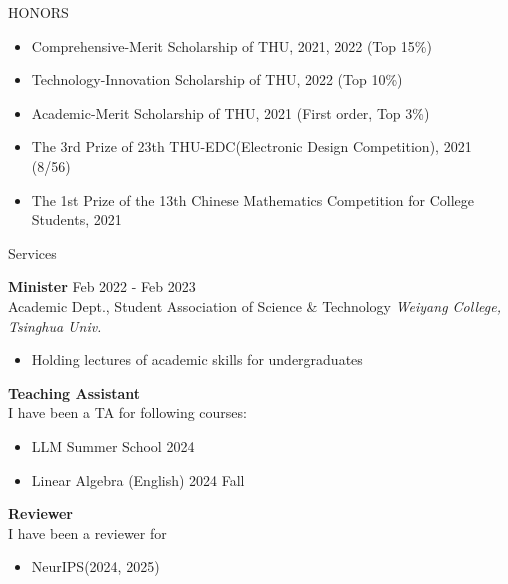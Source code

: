 \documentclass{resume} %
\begin{document}
\begin{rSection}{HONORS}

\begin{itemize}
    \item Comprehensive-Merit Scholarship of THU, 2021, 2022 (Top 15\%)
    \item Technology-Innovation Scholarship of THU, 2022 (Top 10\%)
    \item Academic-Merit Scholarship of THU, 2021 (First order, Top 3\%)
    \item The 3rd Prize of 23th THU-EDC(Electronic Design Competition), 2021 (8/56)
    \item The 1st Prize of the 13th Chinese Mathematics Competition for College Students, 2021
\end{itemize}
\end{rSection}

\begin{rSection}{Services}


\textbf{Minister} \hfill Feb 2022 - Feb 2023\\
Academic Dept., Student Association of Science \& Technology \hfill \textit{Weiyang College, Tsinghua Univ.}
\begin{itemize}
    \item Holding lectures of academic skills for undergraduates
\end{itemize}

\textbf{Teaching Assistant} \\
I have been a TA for following courses:
\begin{itemize}
    \item LLM Summer School 2024
    \item Linear Algebra (English) 2024 Fall
\end{itemize}
\textbf{Reviewer} \\
I have been a reviewer for 
\begin{itemize}
    \item NeurIPS(2024, 2025)
\end{itemize}

\end{rSection}
\end{document}
